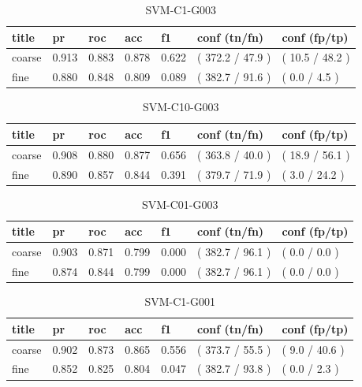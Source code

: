 \documentclass[ms]{nuthesis}
\begin{document}
\FloatBarrier
\begin{table}[h]
\centering
\begin{tabular}{|l||l||l||l||l||l||l|}\toprule
title & pr & roc & acc & f1 & conf (tn/fn) & conf (fp/tp) \\ \midrule
coarse & 0.913 & 0.883 & 0.878 & 0.622 & ( 372.2 / 47.9 ) & ( 10.5 / 48.2 ) \\
fine & 0.880 & 0.848 & 0.809 & 0.089 & ( 382.7 / 91.6 ) & ( 0.0 / 4.5 ) \\ \bottomrule
\end{tabular}
\caption{SVM-C1-G003}
\label{tab:SVM-C1-G003}
\end{table}
\FloatBarrier


\FloatBarrier
\begin{table}[h]
\centering
\begin{tabular}{|l||l||l||l||l||l||l|}\toprule
title & pr & roc & acc & f1 & conf (tn/fn) & conf (fp/tp) \\ \midrule
coarse & 0.908 & 0.880 & 0.877 & 0.656 & ( 363.8 / 40.0 ) & ( 18.9 / 56.1 ) \\
fine & 0.890 & 0.857 & 0.844 & 0.391 & ( 379.7 / 71.9 ) & ( 3.0 / 24.2 ) \\ \bottomrule
\end{tabular}
\caption{SVM-C10-G003}
\label{tab:SVM-C10-G003}
\end{table}
\FloatBarrier

\FloatBarrier
\begin{table}[h]
\centering
\begin{tabular}{|l||l||l||l||l||l||l|}\toprule
title & pr & roc & acc & f1 & conf (tn/fn) & conf (fp/tp) \\ \midrule
coarse & 0.903 & 0.871 & 0.799 & 0.000 & ( 382.7 / 96.1 ) & ( 0.0 / 0.0 ) \\
fine & 0.874 & 0.844 & 0.799 & 0.000 & ( 382.7 / 96.1 ) & ( 0.0 / 0.0 ) \\ \bottomrule
\end{tabular}
\caption{SVM-C01-G003}
\label{tab:SVM-C01-G003}
\end{table}
\FloatBarrier

\FloatBarrier
\begin{table}[h]
\centering
\begin{tabular}{|l||l||l||l||l||l||l|}\toprule
title & pr & roc & acc & f1 & conf (tn/fn) & conf (fp/tp) \\ \midrule
coarse & 0.902 & 0.873 & 0.865 & 0.556 & ( 373.7 / 55.5 ) & ( 9.0 / 40.6 ) \\
fine & 0.852 & 0.825 & 0.804 & 0.047 & ( 382.7 / 93.8 ) & ( 0.0 / 2.3 ) \\ \bottomrule
\end{tabular}
\caption{SVM-C1-G001}
\label{tab:SVM-C1-G001}
\end{table}
\FloatBarrier
\end{document}
